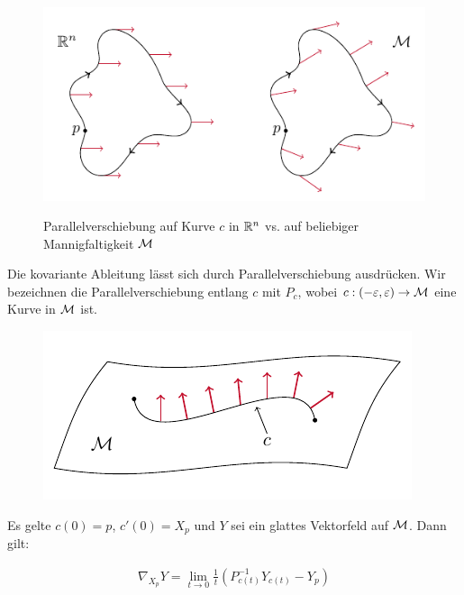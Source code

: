 
\begin{figure}[H]
\centering
\includegraphics[width=0.7\linewidth]{figures/tikz/parallelshift_rn_vs_manifold.pdf}
\label{img:parallelshift_rn_vs_manifold}
\caption{Parallelverschiebung auf Kurve $c$ in $\mathbb{R}^n$ vs. auf beliebiger Mannigfaltigkeit $\mathcal{M}$}
\end{figure} 

Die kovariante Ableitung lässt sich durch Parallelverschiebung ausdrücken.
Wir bezeichnen die Parallelverschiebung entlang $c$ mit $P_c$, wobei $c: (-\varepsilon , \varepsilon) \to \mathcal{M}$ eine Kurve in $\mathcal{M}$ ist.
\begin{figure}[H]
\centering
\includegraphics[width=0.5\linewidth]{figures/tikz/parallel_shift_on_curve.pdf}
\label{img:parallel_shift_on_curve}
\end{figure} 
Es gelte $c(0)=p$, $c'(0) = X_p$ und $Y$ sei ein glattes Vektorfeld auf $\mathcal{M}$.
Dann gilt:

\begin{align}
\label{eq:parallelcovd}
\nabla_{X_p} Y = \lim\limits_{t \rightarrow 0} \frac{1}{t} \left( P^{-1}_{c(t)} Y_{c(t)} - Y_p\right) 
\end{align}

